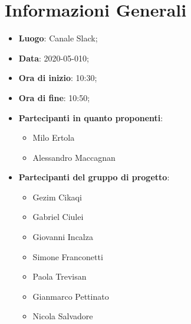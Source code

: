 \section{Informazioni Generali}
	\begin{itemize}
		\item \textbf {Luogo}: Canale Slack;
		\item \textbf {Data}: 2020-05-010;
		\item \textbf {Ora di inizio}: 10:30;
		\item \textbf {Ora di fine}: 10:50;
		\item \textbf {Partecipanti in quanto proponenti}:
		  \begin{itemize}
		    \item Milo Ertola
		    \item Alessandro Maccagnan
		  \end{itemize}
		\item \textbf {Partecipanti del gruppo di progetto}:
			\begin{itemize}
				\item Gezim Cikaqi
				\item Gabriel Ciulei
				\item Giovanni Incalza
				\item Simone Franconetti
				\item Paola Trevisan
				\item Gianmarco Pettinato
				\item Nicola Salvadore
			\end{itemize}
	\end{itemize}
